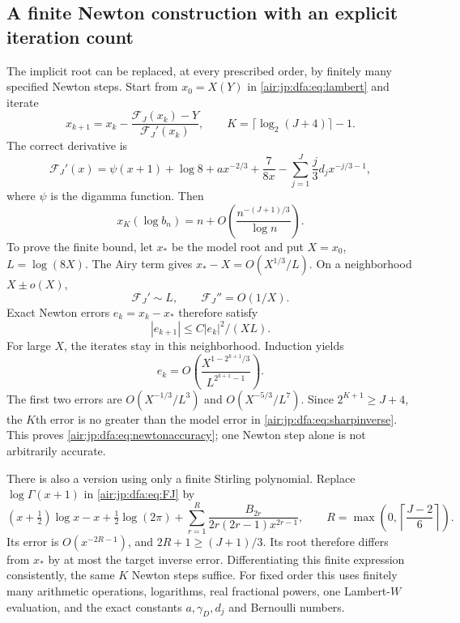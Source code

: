 \documentclass[11pt,letterpaper]{article}
\numberwithin{equation}{section}
\theoremstyle{remark}
\begin{document}
\subsection{A finite Newton construction with an explicit iteration count}
The implicit root can be replaced, at every prescribed order, by finitely many specified Newton steps. Start from $x_0=X(Y)$ in \eqref{air:jp:dfa:eq:lambert} and iterate
\begin{equation}\label{air:jp:dfa:eq:newton}
 x_{k+1}=x_k-\frac{\mathcal F_J(x_k)-Y}{\mathcal F_J'(x_k)},\qquad
 K=\lceil\log_2(J+4)\rceil-1.
\end{equation}
The correct derivative is
\begin{equation}\label{air:jp:dfa:eq:Fprime}
 \mathcal F_J'(x)=\psi(x+1)+\log8+ax^{-2/3}+\frac7{8x}
 -\sum_{j=1}^J\frac j3d_jx^{-j/3-1},
\end{equation}
where $\psi$ is the digamma function. Then
\begin{equation}\label{air:jp:dfa:eq:newtonaccuracy}
 x_K(\log b_n)=n+O\!\left(\frac{n^{-(J+1)/3}}{\log n}\right).
\end{equation}
To prove the finite bound, let $x_*$ be the model root and put $X=x_0$, $L=\log(8X)$. The Airy term gives $x_*-X=O(X^{1/3}/L)$. On a neighborhood $X\pm o(X)$,
\[
 \mathcal F_J'\sim L,\qquad \mathcal F_J''=O(1/X).
\]
Exact Newton errors $e_k=x_k-x_*$ therefore satisfy
\[
 |e_{k+1}|\le C|e_k|^2/(XL).
\]
For large $X$, the iterates stay in this neighborhood. Induction yields
\begin{equation}\label{air:jp:dfa:eq:newtonerrors}
 e_k=O\!\left(\frac{X^{1-2^{k+1}/3}}{L^{2^{k+1}-1}}\right).
\end{equation}
The first two errors are $O(X^{-1/3}/L^3)$ and $O(X^{-5/3}/L^7)$. Since $2^{K+1}\ge J+4$, the $K$th error is no greater than the model error in \eqref{air:jp:dfa:eq:sharpinverse}. This proves \eqref{air:jp:dfa:eq:newtonaccuracy}; one Newton step alone is not arbitrarily accurate.

There is also a version using only a finite Stirling polynomial. Replace $\log\Gamma(x+1)$ in \eqref{air:jp:dfa:eq:FJ} by
\begin{equation}\label{air:jp:dfa:eq:stirling}
 (x+\tfrac12)\log x-x+\tfrac12\log(2\pi)
 +\sum_{r=1}^R\frac{B_{2r}}{2r(2r-1)x^{2r-1}},\qquad
 R=\max\left(0,\left\lceil\frac{J-2}{6}\right\rceil\right).
\end{equation}
Its error is $O(x^{-2R-1})$, and $2R+1\ge(J+1)/3$. Its root therefore differs from $x_*$ by at most the target inverse error. Differentiating this finite expression consistently, the same $K$ Newton steps suffice. For fixed order this uses finitely many arithmetic operations, logarithms, real fractional powers, one Lambert-$W$ evaluation, and the exact constants $a,\gamma_D,d_j$ and Bernoulli numbers.
\end{document}
